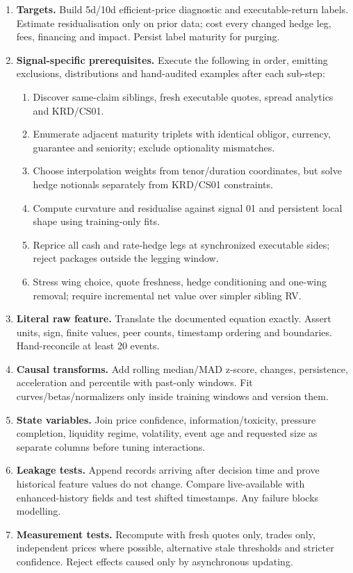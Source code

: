 \documentclass[10pt]{article}
\begin{document}
\begin{enumerate}[leftmargin=2em,label=\textbf{A\arabic*.}]
\item \textbf{Targets.} Build 5d/10d efficient-price diagnostic and executable-return labels. Estimate residualisation only on prior data; cost every changed hedge leg, fees, financing and impact. Persist label maturity for purging.
\item \textbf{Signal-specific prerequisites.} Execute the following in order, emitting exclusions, distributions and hand-audited examples after each sub-step:
\begin{enumerate}[label=\alph*)]
\item Discover same-claim siblings, fresh executable quotes, spread analytics and KRD/CS01.
\item Enumerate adjacent maturity triplets with identical obligor, currency, guarantee and seniority; exclude optionality mismatches.
\item Choose interpolation weights from tenor/duration coordinates, but solve hedge notionals separately from KRD/CS01 constraints.
\item Compute curvature and residualise against signal 01 and persistent local shape using training-only fits.
\item Reprice all cash and rate-hedge legs at synchronized executable sides; reject packages outside the legging window.
\item Stress wing choice, quote freshness, hedge conditioning and one-wing removal; require incremental net value over simpler sibling RV.
\end{enumerate}
\item \textbf{Literal raw feature.} Translate the documented equation exactly. Assert units, sign, finite values, peer counts, timestamp ordering and boundaries. Hand-reconcile at least 20 events.
\item \textbf{Causal transforms.} Add rolling median/MAD z-score, changes, persistence, acceleration and percentile with past-only windows. Fit curves/betas/normalizers only inside training windows and version them.
\item \textbf{State variables.} Join price confidence, information/toxicity, pressure completion, liquidity regime, volatility, event age and requested size as separate columns before tuning interactions.
\item \textbf{Leakage tests.} Append records arriving after decision time and prove historical feature values do not change. Compare live-available with enhanced-history fields and test shifted timestamps. Any failure blocks modelling.
\item \textbf{Measurement tests.} Recompute with fresh quotes only, trades only, independent prices where possible, alternative stale thresholds and stricter confidence. Reject effects caused only by asynchronous updating.

\end{enumerate}
\end{document}
